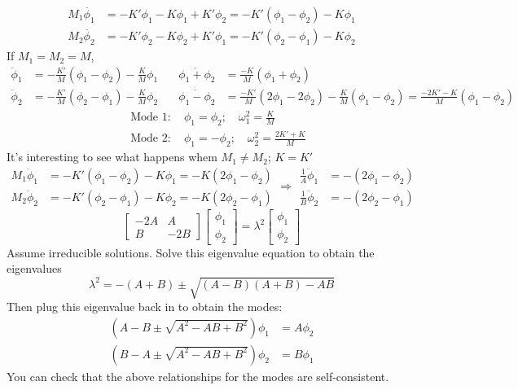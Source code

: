 \documentclass[twoside,10pt]{amsart}
\newcommand{\problemhead}[1]
  {\smallskip
   \noindent{\large\bf Problem #1.}
   \smallskip}
\begin{document}
\problemhead{1.11} \[
\begin{aligned}
  M_1 \ddot{\phi_1} & = -K' \phi_1 - K \phi_1 + K' \phi_2 = -K' (\phi_1 - \phi_2 ) - K\phi_1  \\
  M_2 \ddot{\phi_2} & = -K' \phi_2 - K \phi_2 + K' \phi_1 = -K' (\phi_2 - \phi_1 ) - K\phi_2 
\end{aligned}
\]
If $M_1 = M_2 = M$, 
\[
\begin{aligned}
  \ddot{\phi}_1 & = -\frac{K'}{M} (\phi_1 - \phi_2 ) - \frac{K}{M} \phi_1  \\
  \ddot{\phi}_2 & = -\frac{K'}{M} (\phi_2 - \phi_1 ) - \frac{K}{M} \phi_2
\end{aligned} \quad 
\begin{aligned}
  \ddot{\phi_1 + \phi_2} & = \frac{-K}{M} (\phi_1 + \phi_2) \\
  \ddot{ \phi_1 - \phi_2} & = \frac{ -K'}{M} ( 2 \phi_1 - 2\phi_2) - \frac{K}{M} (\phi_1 - \phi_2) = \frac{ -2K' - K}{M} (\phi_1 - \phi_2 )
\end{aligned}
\]
\[
\begin{aligned}
  & \text{ Mode } 1 : \quad \phi_1 = \phi_2; \quad \omega_1^2 = \frac{K}{M} \\
  & \text{ Mode } 2 : \quad \phi_1 = -\phi_2 ; \quad \omega_2^2 = \frac{ 2K' + K}{M} 
\end{aligned}
\]
It's interesting to see what happens whem $M_1 \neq M_2$; \quad $K=K'$
\[
\begin{aligned}
  M_1 \ddot{\phi}_1 & = - K' (\phi_1 - \phi_2) - K \phi_1 = -K (2 \phi_1 - \phi_2 ) \\
  M_2 \ddot{\phi}_2 & = - K' (\phi_2 - \phi_1) - K \phi_2 = -K (2 \phi_2 - \phi_1 ) 
\end{aligned} \Longrightarrow
\begin{aligned}
  \frac{1}{A} \ddot{\phi}_1 & = -(2\phi_1 - \phi_2) \\
  \frac{1}{B} \ddot{\phi}_2 & = -(2 \phi_2 - \phi_1)
\end{aligned}
\]
\[
\left[ \begin{matrix} -2A & A \\
B & -2B \end{matrix} \right] \left[ \begin{matrix} \phi_1 \\ \phi_2 \end{matrix} \right] = \lambda^2 \left[ \begin{matrix} \phi_1 \\ \phi_2 \end{matrix} \right] 
\]
Assume irreducible solutions.  Solve this eigenvalue equation to obtain the eigenvalues
\[
\lambda^2 = -(A+B) \pm \sqrt{ (A-B)(A+B) - AB }
\]
Then plug this eigenvalue back in to obtain the modes:
\[
\begin{aligned}
  (A- B \pm \sqrt{ A^2 - AB + B^2 } ) \phi_1 & = A \phi_2 \\
  (B-A \pm \sqrt{ A^2 - AB + B^2 } ) \phi_2 & = B \phi_1
\end{aligned}
\]
You can check that the above relationships for the modes are self-consistent.  
\end{document}
